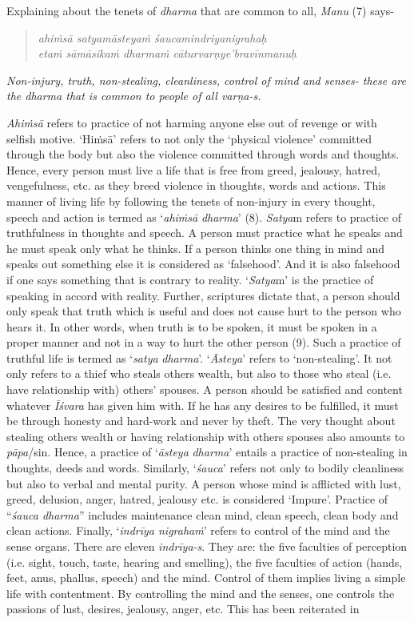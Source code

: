 Explaining about the tenets of \emph{dharma} that are common to all, \emph{Manu} (7) says-

\begin{verse}
\emph{ahiṁsā satyamāsteyaṁ śaucamindriyanigrahaḥ }\\
\emph{etaṁ sāmāsikaṁ dharmaṁ cāturvarṇye'bravīnmanuḥ }
\end{verse}

\emph{Non-injury, truth, non-stealing, cleanliness, control of mind and senses- these are the dharma that is common to people of all varṇa-s.}

\emph{Ahiṁsā} refers to practice of not harming anyone else out of revenge or with selfish motive. `Hiṁsā' refers to not only the `physical violence' committed through the body but also the violence committed through words and thoughts. Hence, every person must live a life that is free from greed, jealousy, hatred, vengefulness, etc. as they breed violence in thoughts, words and actions. This manner of living life by following the tenets of non-injury in every thought, speech and action is termed as `\emph{ahiṁsā} \emph{dharma}' (8). \emph{Satya}m refers to practice of truthfulness in thoughts and speech. A person must practice what he speaks and he must speak only what he thinks. If a person thinks one thing in mind and speaks out something else it is considered as `falsehood'. And it is also falsehood if one says something that is contrary to reality. `\emph{Satya}m' is the practice of speaking in accord with reality. Further, scriptures dictate that, a person should only speak that truth which is useful and does not cause hurt to the person who hears it. In other words, when truth is to be spoken, it must be spoken in a proper manner and not in a way to hurt the other person (9). Such a practice of truthful life is termed as `\emph{satya} \emph{dharma}'. `\emph{Āsteya}' refers to `non-stealing'. It not only refers to a thief who steals others wealth, but also to those who steal (i.e. have relationship with) others' spouses. A person should be satisfied and content whatever \emph{Īśvara} has given him with. If he has any desires to be fulfilled, it must be through honesty and hard-work and never by theft. The very thought about stealing others wealth or having relationship with others spouses also amounts to \emph{pāpa}/sin. Hence, a practice of `\emph{āsteya} \emph{dharma}' entails a practice of non-stealing in thoughts, deeds and words. Similarly, `\emph{śauca}' refers not only to bodily cleanliness but also to verbal and mental purity. A person whose mind is afflicted with lust, greed, delusion, anger, hatred, jealousy etc. is considered `Impure'. Practice of ``\emph{śauca dharma}'' includes maintenance clean mind, clean speech, clean body and clean actions. Finally, `\emph{indrīya nigrahaṁ}' refers to control of the mind and the sense organs. There are eleven \emph{indrīya-s}. They are: the five faculties of perception (i.e. sight, touch, taste, hearing and smelling), the five faculties of action (hands, feet, anus, phallus, speech) and the mind. Control of them implies living a simple life with contentment. By controlling the mind and the senses, one controls the passions of lust, desires, jealousy, anger, etc. This has been reiterated in 